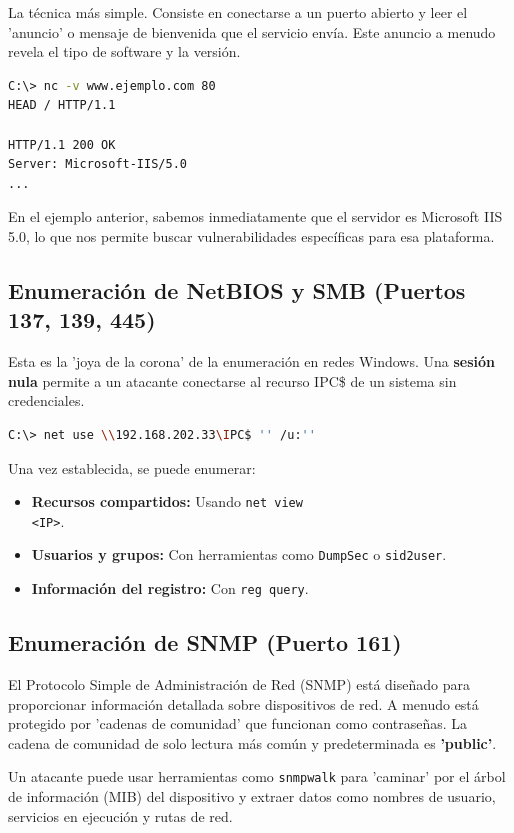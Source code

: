 \documentclass[12pt,a4paper]{article}
\begin{document}
La técnica más simple. Consiste en conectarse a un puerto abierto y leer el 'anuncio' o mensaje de bienvenida que el servicio envía. Este anuncio a menudo revela el tipo de software y la versión.
\begin{lstlisting}[language=bash, caption={Captura de anuncio HTTP con netcat}]
C:\> nc -v www.ejemplo.com 80
HEAD / HTTP/1.1

HTTP/1.1 200 OK
Server: Microsoft-IIS/5.0
...
\end{lstlisting}
En el ejemplo anterior, sabemos inmediatamente que el servidor es Microsoft IIS 5.0, lo que nos permite buscar vulnerabilidades específicas para esa plataforma.

\subsection{Enumeración de NetBIOS y SMB (Puertos 137, 139, 445)}

Esta es la 'joya de la corona' de la enumeración en redes Windows. Una \textbf{sesión nula} permite a un atacante conectarse al recurso IPC\$ de un sistema sin credenciales.
\begin{lstlisting}[language=bash, caption={Estableciendo una sesión nula}]
C:\> net use \\192.168.202.33\IPC$ '' /u:''
\end{lstlisting}
Una vez establecida, se puede enumerar:
\begin{itemize}
    \item \textbf{Recursos compartidos:} Usando \texttt{net view \\<IP>}.
    \item \textbf{Usuarios y grupos:} Con herramientas como \texttt{DumpSec} o \texttt{sid2user}.
    \item \textbf{Información del registro:} Con \texttt{reg query}.
\end{itemize}

\subsection{Enumeración de SNMP (Puerto 161)}

El Protocolo Simple de Administración de Red (SNMP) está diseñado para proporcionar información detallada sobre dispositivos de red. A menudo está protegido por 'cadenas de comunidad' que funcionan como contraseñas. La cadena de comunidad de solo lectura más común y predeterminada es \textbf{'public'}.

Un atacante puede usar herramientas como \texttt{snmpwalk} para 'caminar' por el árbol de información (MIB) del dispositivo y extraer datos como nombres de usuario, servicios en ejecución y rutas de red.
\end{document}
